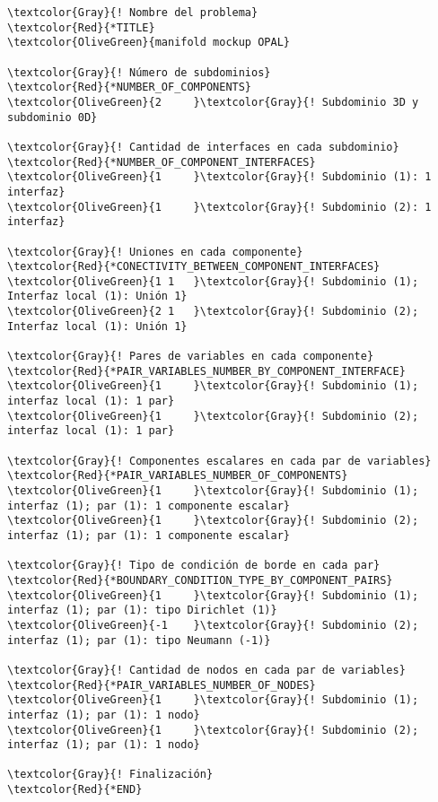 \begin{Verbatim}[frame=single,commandchars=\\\{\}]
\textcolor{Gray}{! Nombre del problema}
\textcolor{Red}{*TITLE}
\textcolor{OliveGreen}{manifold mockup OPAL}

\textcolor{Gray}{! Número de subdominios}
\textcolor{Red}{*NUMBER_OF_COMPONENTS}
\textcolor{OliveGreen}{2     }\textcolor{Gray}{! Subdominio 3D y subdominio 0D}

\textcolor{Gray}{! Cantidad de interfaces en cada subdominio}
\textcolor{Red}{*NUMBER_OF_COMPONENT_INTERFACES}
\textcolor{OliveGreen}{1     }\textcolor{Gray}{! Subdominio (1): 1 interfaz}
\textcolor{OliveGreen}{1     }\textcolor{Gray}{! Subdominio (2): 1 interfaz}

\textcolor{Gray}{! Uniones en cada componente}
\textcolor{Red}{*CONECTIVITY_BETWEEN_COMPONENT_INTERFACES}
\textcolor{OliveGreen}{1 1   }\textcolor{Gray}{! Subdominio (1); Interfaz local (1): Unión 1}
\textcolor{OliveGreen}{2 1   }\textcolor{Gray}{! Subdominio (2); Interfaz local (1): Unión 1}

\textcolor{Gray}{! Pares de variables en cada componente}
\textcolor{Red}{*PAIR_VARIABLES_NUMBER_BY_COMPONENT_INTERFACE}
\textcolor{OliveGreen}{1     }\textcolor{Gray}{! Subdominio (1); interfaz local (1): 1 par}
\textcolor{OliveGreen}{1     }\textcolor{Gray}{! Subdominio (2); interfaz local (1): 1 par}

\textcolor{Gray}{! Componentes escalares en cada par de variables}
\textcolor{Red}{*PAIR_VARIABLES_NUMBER_OF_COMPONENTS}
\textcolor{OliveGreen}{1     }\textcolor{Gray}{! Subdominio (1); interfaz (1); par (1): 1 componente escalar}
\textcolor{OliveGreen}{1     }\textcolor{Gray}{! Subdominio (2); interfaz (1); par (1): 1 componente escalar}

\textcolor{Gray}{! Tipo de condición de borde en cada par}
\textcolor{Red}{*BOUNDARY_CONDITION_TYPE_BY_COMPONENT_PAIRS}
\textcolor{OliveGreen}{1     }\textcolor{Gray}{! Subdominio (1); interfaz (1); par (1): tipo Dirichlet (1)}
\textcolor{OliveGreen}{-1    }\textcolor{Gray}{! Subdominio (2); interfaz (1); par (1): tipo Neumann (-1)}

\textcolor{Gray}{! Cantidad de nodos en cada par de variables}
\textcolor{Red}{*PAIR_VARIABLES_NUMBER_OF_NODES}
\textcolor{OliveGreen}{1     }\textcolor{Gray}{! Subdominio (1); interfaz (1); par (1): 1 nodo}
\textcolor{OliveGreen}{1     }\textcolor{Gray}{! Subdominio (2); interfaz (1); par (1): 1 nodo}

\textcolor{Gray}{! Finalización}
\textcolor{Red}{*END}
\end{Verbatim}

